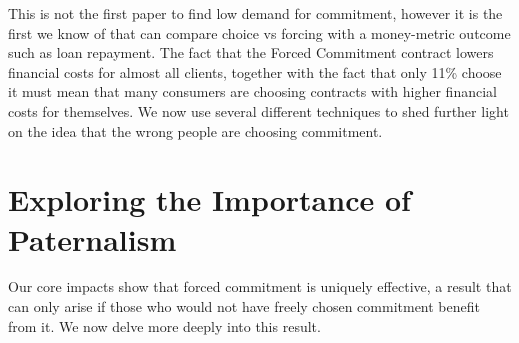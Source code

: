 \documentclass[oneside,11pt]{article}
\begin{document}

   


    
This is not the first paper to find low demand for commitment, however it is the first we know of that can compare choice vs forcing with a money-metric outcome such as loan repayment. The fact that the Forced Commitment contract lowers financial costs for almost all clients, together with the fact that only 11\% choose it must mean that many consumers are choosing contracts with higher financial costs for themselves. We now use several different techniques to shed further light on the idea that the wrong people are choosing commitment. 


\section{Exploring the Importance of Paternalism}
\label{exploring}


Our core impacts show that forced commitment is uniquely effective, a result that can only arise if those who would not have freely chosen commitment benefit from it.  We now delve more deeply into this result.
\end{document}
